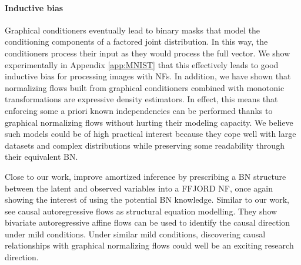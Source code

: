 \documentclass[twoside]{article}
\newcommand{\antoine}[1]{\textcolor{orange}{[AW: #1]}}
\begin{document}
\paragraph{Inductive bias}
Graphical conditioners eventually lead to binary masks that model the conditioning components of a factored joint distribution. In this way, the conditioners process their input as they would process the full vector.%
We show experimentally in Appendix \ref{app:MNIST} that this effectively leads to good inductive bias for processing images with NFs.
In addition, we have shown that normalizing flows built from graphical conditioners combined with monotonic transformations are expressive density estimators.
In effect, this means that enforcing some a priori known independencies can be performed thanks to graphical normalizing flows without hurting their modeling capacity. We believe such models could be of high practical interest because they cope well with large datasets and complex distributions while preserving some readability through their equivalent BN.

Close to our work, \citet{wood} improve amortized inference by prescribing a BN structure between the latent and observed variables into a FFJORD NF, once again showing the interest of using the potential BN knowledge. Similar to our work, \citet{khemakhem2020causal} see causal autoregressive flows as structural equation modelling. They show bivariate autoregressive affine flows can be used to identify the causal direction under mild conditions. Under similar mild conditions, discovering causal relationships with graphical normalizing flows could well be an exciting research direction.


\end{document}
